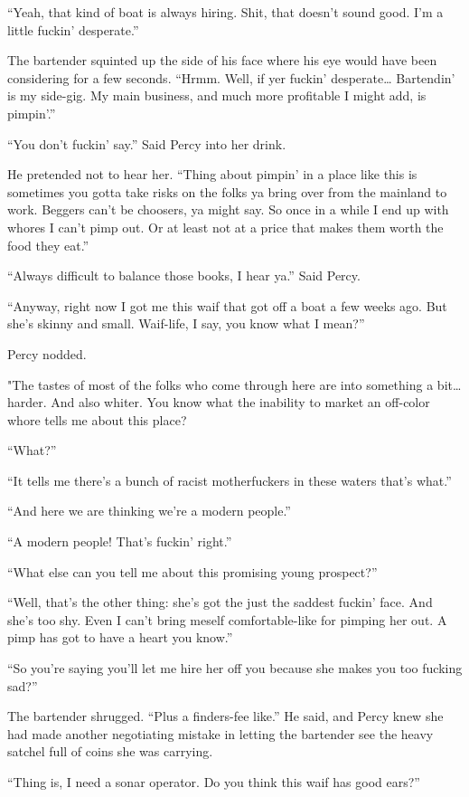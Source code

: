\documentclass[]{scrbook}
\begin{document}
``Yeah, that kind of boat is always hiring. Shit, that doesn't sound
good. I'm a little fuckin' desperate.''

The bartender squinted up the side of his face where his eye would have
been considering for a few seconds. ``Hrmm. Well, if yer fuckin'
desperate\ldots{} Bartendin' is my side-gig. My main business, and much
more profitable I might add, is pimpin'.''

``You don't fuckin' say.'' Said Percy into her drink.

He pretended not to hear her. ``Thing about pimpin' in a place like this
is sometimes you gotta take risks on the folks ya bring over from the
mainland to work. Beggers can't be choosers, ya might say. So once in a
while I end up with whores I can't pimp out. Or at least not at a price
that makes them worth the food they eat.''

``Always difficult to balance those books, I hear ya.'' Said Percy.

``Anyway, right now I got me this waif that got off a boat a few weeks
ago. But she's skinny and small. Waif-life, I say, you know what I
mean?''

Percy nodded.

"The tastes of most of the folks who come through here are into
something a bit\ldots{} harder. And also whiter. You know what the
inability to market an off-color whore tells me about this place?

``What?''

``It tells me there's a bunch of racist motherfuckers in these waters
that's what.''

``And here we are thinking we're a modern people.''

``A modern people! That's fuckin' right.''

``What else can you tell me about this promising young prospect?''

``Well, that's the other thing: she's got the just the saddest fuckin'
face. And she's too shy. Even I can't bring meself comfortable-like for
pimping her out. A pimp has got to have a heart you know.''

``So you're saying you'll let me hire her off you because she makes you
too fucking sad?''

The bartender shrugged. ``Plus a finders-fee like.'' He said, and Percy
knew she had made another negotiating mistake in letting the bartender
see the heavy satchel full of coins she was carrying.

``Thing is, I need a sonar operator. Do you think this waif has good
ears?''
\end{document}
